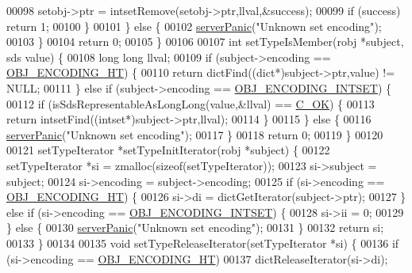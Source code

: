 \begin{DoxyCode}
00098             setobj->ptr = intsetRemove(setobj->ptr,llval,&success);
00099             \textcolor{keywordflow}{if} (success) \textcolor{keywordflow}{return} 1;
00100         \}
00101     \} \textcolor{keywordflow}{else} \{
00102         \hyperlink{server_8h_a11cc378e7778a830b41240578de3b204}{serverPanic}(\textcolor{stringliteral}{"Unknown set encoding"});
00103     \}
00104     \textcolor{keywordflow}{return} 0;
00105 \}
00106 
00107 \textcolor{keywordtype}{int} setTypeIsMember(robj *subject, sds value) \{
00108     \textcolor{keywordtype}{long} \textcolor{keywordtype}{long} llval;
00109     \textcolor{keywordflow}{if} (subject->encoding == \hyperlink{server_8h_a9c10219f68afc557d510d108257d238b}{OBJ\_ENCODING\_HT}) \{
00110         \textcolor{keywordflow}{return} dictFind((dict*)subject->ptr,value) != NULL;
00111     \} \textcolor{keywordflow}{else} \textcolor{keywordflow}{if} (subject->encoding == \hyperlink{server_8h_a214173987de21c3b7661fddd42b05873}{OBJ\_ENCODING\_INTSET}) \{
00112         \textcolor{keywordflow}{if} (isSdsRepresentableAsLongLong(value,&llval) == \hyperlink{server_8h_a303769ef1065076e68731584e758d3e1}{C\_OK}) \{
00113             \textcolor{keywordflow}{return} intsetFind((intset*)subject->ptr,llval);
00114         \}
00115     \} \textcolor{keywordflow}{else} \{
00116         \hyperlink{server_8h_a11cc378e7778a830b41240578de3b204}{serverPanic}(\textcolor{stringliteral}{"Unknown set encoding"});
00117     \}
00118     \textcolor{keywordflow}{return} 0;
00119 \}
00120 
00121 setTypeIterator *setTypeInitIterator(robj *subject) \{
00122     setTypeIterator *si = zmalloc(\textcolor{keyword}{sizeof}(setTypeIterator));
00123     si->subject = subject;
00124     si->encoding = subject->encoding;
00125     \textcolor{keywordflow}{if} (si->encoding == \hyperlink{server_8h_a9c10219f68afc557d510d108257d238b}{OBJ\_ENCODING\_HT}) \{
00126         si->di = dictGetIterator(subject->ptr);
00127     \} \textcolor{keywordflow}{else} \textcolor{keywordflow}{if} (si->encoding == \hyperlink{server_8h_a214173987de21c3b7661fddd42b05873}{OBJ\_ENCODING\_INTSET}) \{
00128         si->ii = 0;
00129     \} \textcolor{keywordflow}{else} \{
00130         \hyperlink{server_8h_a11cc378e7778a830b41240578de3b204}{serverPanic}(\textcolor{stringliteral}{"Unknown set encoding"});
00131     \}
00132     \textcolor{keywordflow}{return} si;
00133 \}
00134 
00135 \textcolor{keywordtype}{void} setTypeReleaseIterator(setTypeIterator *si) \{
00136     \textcolor{keywordflow}{if} (si->encoding == \hyperlink{server_8h_a9c10219f68afc557d510d108257d238b}{OBJ\_ENCODING\_HT})
00137         dictReleaseIterator(si->di);

\end{DoxyCode}
